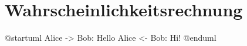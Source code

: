 \section{Wahrscheinlichkeitsrechnung}
\begin{plantuml}
	@startuml
	Alice -> Bob: Hello
	Alice <- Bob: Hi!
	@enduml
\end{plantuml}